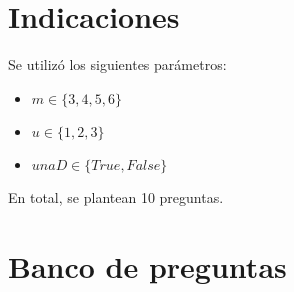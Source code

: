 \documentclass[a4,11pt]{aleph-notas}
\begin{document}
\encabezado

\section{Indicaciones}



Se utilizó los siguientes parámetros:
\begin{itemize}
	\item $m \in \{3, 4, 5, 6\}$
	\item $u \in \{1, 2, 3\}$
	\item $unaD \in \{True, False\}$

\end{itemize}
En total, se plantean 10 preguntas.


\section{Banco de preguntas}
\end{document}
